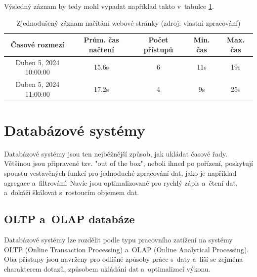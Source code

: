 Výsledný záznam by tedy mohl vypadat například takto v~tabulce \ref{table:2}.
\begin{table}[ht!]
\centering
\begin{tabular}{||c | c | c | c | c||} 
    \hline
    \textbf{Časové rozmezí} & \textbf{Prům. čas načtení} & \textbf{Počet přístupů} & \textbf{Min. čas} & \textbf{Max. čas} \\ [0.5ex] 
    \hline\hline
    Duben 5, 2024 10:00:00 & 15.6s & 6 & 11s & 19s \\ 
    \hline
    Duben 5, 2024 11:00:00 & 17.2s & 4 & 9s & 25s \\
    \hline
\end{tabular}
\caption{Zjednodušený záznam načítání webové stránky (zdroj: vlastní zpracování)}
\label{table:2}
\end{table}

\section{Databázové systémy}
Databázové systémy jsou ten nejběžnější způsob, jak ukládat časové řady.  Většinou jsou připravené tzv. "out of the box", neboli ihned po pořízení, 
poskytují spoustu vestavěných funkcí pro jednoduché zpracování dat, jako je například agregace a~filtrování.
Navíc jsou optimalizované pro rychlý zápis a~čtení dat, a~dokáží škálovat s~rostoucím objemem dat. \cite{nielsen2019practical}

\subsection{OLTP a~OLAP databáze}

Databázové systémy lze rozdělit podle typu pracovního zatížení na systémy OLTP (Online Transaction Processing) a~OLAP (Online Analytical Processing). 
Oba přístupy jsou navrženy pro odlišné způsoby práce s~daty a~liší se zejména charakterem dotazů, způsobem ukládání dat a~optimalizací výkonu. 
\cite{clickhouseoltpvsolap}

